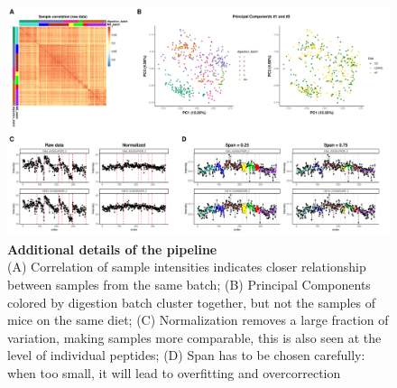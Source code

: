 \documentclass[num-refs]{wiley-article}
\begin{document}
\begin{figure}
	\includegraphics[width=\textwidth]{figures/SuppFig3_pipeline_extras.pdf}
	
	\caption{\textbf{Additional details of the pipeline} \\
		\footnotesize (A) Correlation of sample intensities indicates closer relationship between samples from the same batch; (B) Principal Components colored by digestion batch cluster together, but not the samples of mice on the same diet; (C) Normalization removes a large fraction of variation, making samples more comparable, this is also seen at the level of individual peptides; (D) Span has to be chosen carefully: when too small, it will lead to overfitting and overcorrection}
	\label{fig:batch_figS3_pipeline_extra}
\end{figure}
\end{document}
